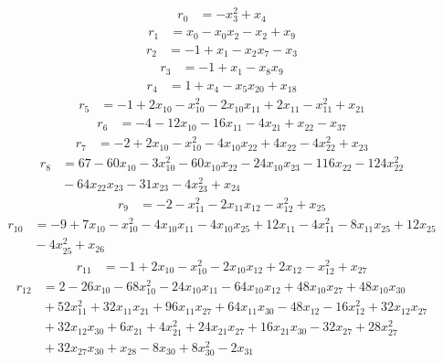 \[\begin{aligned}
r_{0}&=-x_{3}^{2}+x_{4}
\end{aligned}\]
\[\begin{aligned}
r_{1}&=x_{0}-x_{0}x_{2}-x_{2}+x_{9}
\end{aligned}\]
\[\begin{aligned}
r_{2}&=-1+x_{1}-x_{2}x_{7}-x_{3}
\end{aligned}\]
\[\begin{aligned}
r_{3}&=-1+x_{1}-x_{8}x_{9}
\end{aligned}\]
\[\begin{aligned}
r_{4}&=1+x_{4}-x_{5}x_{20}+x_{18}
\end{aligned}\]
\[\begin{aligned}
r_{5}&=-1+2x_{10}-x_{10}^{2}-2x_{10}x_{11}+2x_{11}-x_{11}^{2}+x_{21}
\end{aligned}\]
\[\begin{aligned}
r_{6}&=-4-12x_{10}-16x_{11}-4x_{21}+x_{22}-x_{37}
\end{aligned}\]
\[\begin{aligned}
r_{7}&=-2+2x_{10}-x_{10}^{2}-4x_{10}x_{22}+4x_{22}-4x_{22}^{2}+x_{23}
\end{aligned}\]
\[\begin{aligned}
r_{8}&=67-60x_{10}-3x_{10}^{2}-60x_{10}x_{22}-24x_{10}x_{23}-116x_{22}-124x_{22}^{2}\\
&{}-64x_{22}x_{23}-31x_{23}-4x_{23}^{2}+x_{24}
\end{aligned}\]
\[\begin{aligned}
r_{9}&=-2-x_{11}^{2}-2x_{11}x_{12}-x_{12}^{2}+x_{25}
\end{aligned}\]
\[\begin{aligned}
r_{10}&=-9+7x_{10}-x_{10}^{2}-4x_{10}x_{11}-4x_{10}x_{25}+12x_{11}-4x_{11}^{2}-8x_{11}x_{25}+12x_{25}\\
&{}-4x_{25}^{2}+x_{26}
\end{aligned}\]
\[\begin{aligned}
r_{11}&=-1+2x_{10}-x_{10}^{2}-2x_{10}x_{12}+2x_{12}-x_{12}^{2}+x_{27}
\end{aligned}\]
\[\begin{aligned}
r_{12}&=2-26x_{10}-68x_{10}^{2}-24x_{10}x_{11}-64x_{10}x_{12}+48x_{10}x_{27}+48x_{10}x_{30}\\
&{}+52x_{11}^{2}+32x_{11}x_{21}+96x_{11}x_{27}+64x_{11}x_{30}-48x_{12}-16x_{12}^{2}+32x_{12}x_{27}\\
&{}+32x_{12}x_{30}+6x_{21}+4x_{21}^{2}+24x_{21}x_{27}+16x_{21}x_{30}-32x_{27}+28x_{27}^{2}\\
&{}+32x_{27}x_{30}+x_{28}-8x_{30}+8x_{30}^{2}-2x_{31}
\end{aligned}\]
